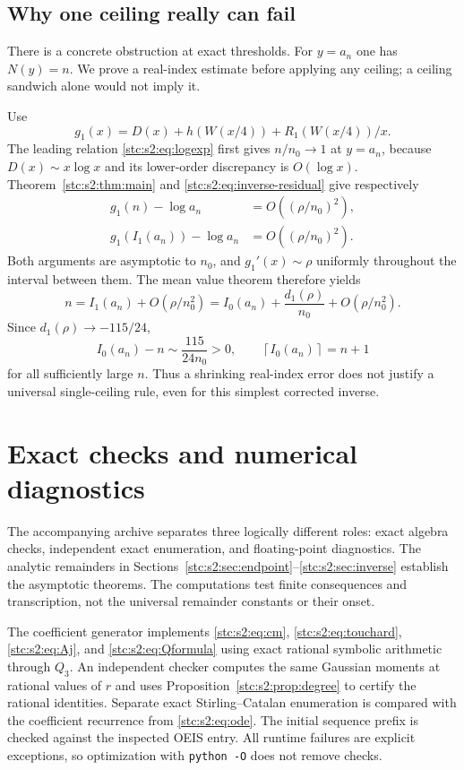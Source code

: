 \documentclass[11pt,letterpaper]{article}
\numberwithin{equation}{section}
\theoremstyle{remark}\newtheorem{remark}[theorem]{Remark}
\newcommand{\ceil}[1]{\left\lceil #1\right\rceil}
\begin{document}
\subsection{Why one ceiling really can fail}\label{stc:s2:sec:rounding}
There is a concrete obstruction at exact thresholds. For $y=a_n$ one has $N(y)=n$. We prove a real-index estimate before applying any ceiling; a ceiling sandwich alone would not imply it.

Use
\[
 g_1(x)=D(x)+h(W(x/4))+R_1(W(x/4))/x.
\]
The leading relation \eqref{stc:s2:eq:logexp} first gives $n/n_0\to1$ at $y=a_n$, because $D(x)\sim x\log x$ and its lower-order discrepancy is $O(\log x)$. Theorem~\ref{stc:s2:thm:main} and \eqref{stc:s2:eq:inverse-residual} give respectively
\begin{align*}
 g_1(n)-\log a_n&=O((\rho/n_0)^2),\\
 g_1(I_1(a_n))-\log a_n&=O((\rho/n_0)^2).
\end{align*}
Both arguments are asymptotic to $n_0$, and $g_1'(x)\sim\rho$ uniformly throughout the interval between them. The mean value theorem therefore yields
\begin{equation}\label{stc:s2:eq:rounding-residual}
 n=I_1(a_n)+O(\rho/n_0^2)
   =I_0(a_n)+\frac{d_1(\rho)}{n_0}+O(\rho/n_0^2).
\end{equation}
Since $d_1(\rho)\to-115/24$,
\begin{equation}\label{stc:s2:eq:rounding-failure}
 I_0(a_n)-n\sim\frac{115}{24n_0}>0,
 \qquad \ceil{I_0(a_n)}=n+1
\end{equation}
for all sufficiently large $n$. Thus a shrinking real-index error does not justify a universal single-ceiling rule, even for this simplest corrected inverse.

\section{Exact checks and numerical diagnostics}\label{stc:s2:sec:computation}
The accompanying archive separates three logically different roles: exact algebra checks, independent exact enumeration, and floating-point diagnostics. The analytic remainders in Sections~\ref{stc:s2:sec:endpoint}--\ref{stc:s2:sec:inverse} establish the asymptotic theorems. The computations test finite consequences and transcription, not the universal remainder constants or their onset.

The coefficient generator implements \eqref{stc:s2:eq:cm}, \eqref{stc:s2:eq:touchard}, \eqref{stc:s2:eq:Aj}, and \eqref{stc:s2:eq:Qformula} using exact rational symbolic arithmetic through $Q_3$. An independent checker computes the same Gaussian moments at rational values of $r$ and uses Proposition~\ref{stc:s2:prop:degree} to certify the rational identities. Separate exact Stirling--Catalan enumeration is compared with the coefficient recurrence from \eqref{stc:s2:eq:ode}. The initial sequence prefix is checked against the inspected OEIS entry. All runtime failures are explicit exceptions, so optimization with \texttt{python -O} does not remove checks.
\end{document}
